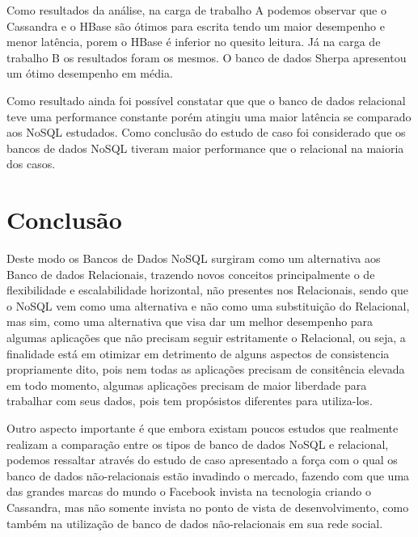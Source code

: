\documentclass[12pt]{article}
\begin{document}
Como resultados da análise, na carga de trabalho A podemos observar que o Cassandra e o HBase são ótimos para escrita tendo um maior desempenho e menor latência, porem o HBase é inferior no quesito leitura. Já na carga de trabalho B os resultados foram os mesmos. O banco de dados Sherpa apresentou um ótimo desempenho em média.

Como resultado ainda foi possível constatar que que o banco de dados relacional teve uma performance constante porém atingiu uma maior latência se comparado aos NoSQL estudados. Como conclusão do estudo de caso foi considerado que os bancos de dados NoSQL tiveram maior performance que o relacional na maioria dos casos.

\section{Conclusão}
\label{sec:conclusao}

Deste modo os Bancos de Dados NoSQL surgiram como um alternativa aos Banco de dados Relacionais, trazendo novos conceitos principalmente o de flexibilidade e escalabilidade horizontal, não presentes nos Relacionais, sendo que o NoSQL vem como uma alternativa e não como uma substituição do Relacional, mas sim, como uma alternativa que visa dar um melhor desempenho para algumas aplicações que não precisam seguir estritamente o Relacional, ou seja, a finalidade está em otimizar em detrimento de alguns aspectos de consistencia propriamente dito, pois nem todas as aplicações precisam de consitência elevada em todo momento, algumas aplicações precisam de maior liberdade para trabalhar com seus dados, pois tem propósistos diferentes para utiliza-los.

Outro aspecto importante é que embora existam poucos estudos que realmente realizam a comparação entre os tipos de banco de dados NoSQL e relacional, podemos ressaltar através do estudo de caso apresentado a força com o qual os banco de dados não-relacionais estão invadindo o mercado, fazendo com que uma das grandes marcas do mundo o Facebook invista na tecnologia criando o Cassandra, mas não somente invista no ponto de vista de desenvolvimento, como também na utilização de banco de dados não-relacionais em sua rede social.



\end{document}
